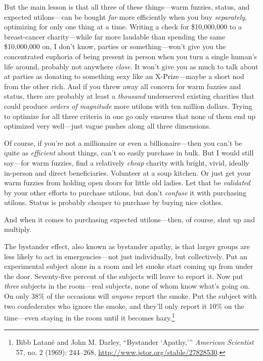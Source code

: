 {
 But the main lesson is that all three of these things---warm
fuzzies, status, and expected utilons---can be bought \textit{far} more
efficiently when you buy \textit{separately}, optimizing for only one
thing at a time. Writing a check for \$10,000,000 to a breast-cancer
charity---while far more laudable than spending the same \$10,000,000
on, I don't know, parties or
something---won't give you the concentrated euphoria of
being present in person when you turn a single human's
life around, probably not anywhere \textit{close}. It
won't give you as much to talk about at parties as
donating to something sexy like an X-Prize---maybe a short nod from the
other rich. And if you threw away all concern for warm fuzzies and
status, there are probably at least a \textit{thousand} underserved
existing charities that could produce \textit{orders of magnitude} more
utilons with ten million dollars. Trying to optimize for all three
criteria in one go only ensures that none of them end up optimized very
well---just vague pushes along all three dimensions.}

{
 Of course, if you're not a millionaire or even a
billionaire---then you can't be quite as
\textit{efficient} about things, can't so easily
purchase in bulk. But I would still say---for warm fuzzies, find a
relatively \textit{cheap} charity with bright, vivid, ideally in-person
and direct beneficiaries. Volunteer at a soup kitchen. Or just get your
warm fuzzies from holding open doors for little old ladies. Let that be
\textit{validated} by your other efforts to purchase utilons, but
don't \textit{confuse} it with purchasing utilons.
Status is probably cheaper to purchase by buying nice clothes.}

{
 And when it comes to purchasing expected utilons---then, of
course, shut up and multiply.}

\myendsectiontext


{
 The bystander effect, also known as bystander apathy, is that
larger groups are less likely to act in emergencies---not just
individually, but collectively. Put an experimental subject alone in a
room and let smoke start coming up from under the door. Seventy-five
percent of the subjects will leave to report it. Now put \textit{three}
subjects in the room---real subjects, none of whom know
what's going on. On only 38\% of the occasions will
\textit{anyone} report the smoke. Put the subject with two confederates
who ignore the smoke, and they'll only report it 10\%
on the time---even staying in the room until it becomes
hazy.\footnote{Bibb Latané and John M. Darley, ``Bystander
`Apathy,'''
\textit{American Scientist} 57, no. 2 (1969): 244--268,
\url{http://www.jstor.org/stable/27828530}.} }

